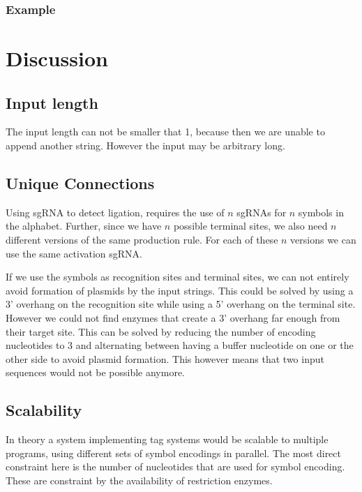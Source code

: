 \documentclass[
11pt, %
a4paper, %
oneside, %
headinclude,footinclude, %
BCOR5mm, %
]{scrartcl}
\begin{document}
\subsubsection{Example}


\section{Discussion}

\subsection{Input length}

The input length can not be smaller that 1, because then we are unable to append
another string. However the input may be arbitrary long.

\subsection{Unique Connections}

Using sgRNA to detect ligation, requires the use of $n$ sgRNAs for $n$ symbols
in the alphabet. Further, since we have $n$ possible terminal sites, we also
need $n$ different versions of the same production rule. For each of these $n$
versions we can use the same activation sgRNA.

If we use the symbols as recognition sites and terminal sites, we can not
entirely avoid formation of plasmids by the input strings. This could be solved
by using a 3' overhang on the recognition site while using a 5' overhang on the
terminal site. However we could not find enzymes that create a 3' overhang far
enough from their target site. This can be solved by reducing the number of
encoding nucleotides to 3 and alternating between having a buffer nucleotide on
one or the other side to avoid plasmid formation. This however means that two
input sequences would not be possible anymore.

\subsection{Scalability}

In theory a system implementing tag systems would be scalable to multiple
programs, using different sets of symbol encodings in parallel. The most direct
constraint here is the number of nucleotides that are used for symbol encoding.
These are constraint by the availability of restriction enzymes.
\end{document}
